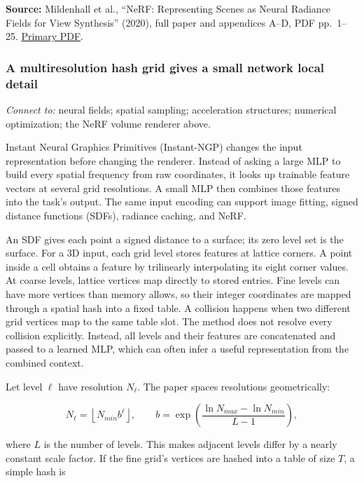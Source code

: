 \textbf{Source:} Mildenhall et al., ``NeRF: Representing Scenes as Neural Radiance Fields for View Synthesis'' (2020), full paper and appendices A--D, PDF pp.~1--25. \href{https://arxiv.org/pdf/2003.08934}{Primary PDF}.

\subsubsection{A multiresolution hash grid gives a small network local detail}\label{04-visual-computing-ii-ch034-a-multiresolution-hash-grid-gives-a-small-network-local-detail}

\emph{Connect to:} neural fields; spatial sampling; acceleration structures; numerical optimization; the NeRF volume renderer above.

Instant Neural Graphics Primitives (Instant-NGP) changes the input representation before changing the renderer. Instead of asking a large MLP to build every spatial frequency from raw coordinates, it looks up trainable feature vectors at several grid resolutions. A small MLP then combines those features into the task's output. The same input encoding can support image fitting, signed distance functions (SDFs), radiance caching, and NeRF.

An SDF gives each point a signed distance to a surface; its zero level set is the surface. For a 3D input, each grid level stores features at lattice corners. A point inside a cell obtains a feature by trilinearly interpolating its eight corner values. At coarse levels, lattice vertices map directly to stored entries. Fine levels can have more vertices than memory allows, so their integer coordinates are mapped through a spatial hash into a fixed table. A collision happens when two different grid vertices map to the same table slot. The method does not resolve every collision explicitly. Instead, all levels and their features are concatenated and passed to a learned MLP, which can often infer a useful representation from the combined context.

Let level \(\ell\) have resolution \(N_\ell\). The paper spaces resolutions geometrically:

\[N_\ell=\left\lfloor N_{min}b^\ell\right\rfloor,\qquad b=\exp\left(\frac{\ln N_{max}-\ln N_{min}}{L-1}\right),\]

where \(L\) is the number of levels. This makes adjacent levels differ by a nearly constant scale factor. If the fine grid's vertices are hashed into a table of size \(T\), a simple hash is

